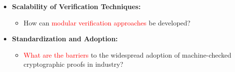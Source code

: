 \begin{itemize}
	\begin{itemize}
		\item[$\bullet$] Is machine-checked proofs for cryptographic algorithms automated \textcolor{red}{without compromising accuracy}?
	\end{itemize}\vfill
	\item \textbf{Scalability of Verification Techniques:}\\[0.2cm]
	\begin{itemize}
		\item[$\bullet$] How can \textcolor{red}{modular verification approaches} be developed?
	\end{itemize}\vfill
	\item \textbf{Standardization and Adoption:}\\[0.2cm]
	\begin{itemize}
	\item[$\bullet$] \textcolor{red}{What are the barriers} to the widespread adoption of machine-checked cryptographic proofs in industry?
	\end{itemize}\vfill
\end{itemize}